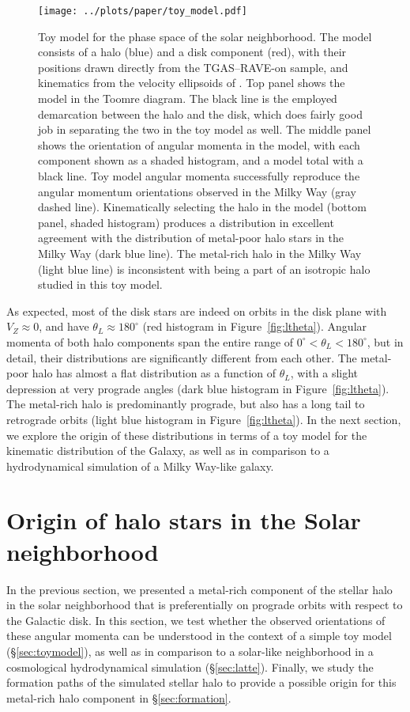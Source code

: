 \documentclass[apj, twocolappendix, numberedappendix, appendixfloats]{emulateapj}
\begin{document}
\begin{figure}
\begin{center}
\texttt{[image: ../plots/paper/toy\_model.pdf]}
\caption{Toy model for the phase space of the solar neighborhood.
The model consists of a halo (blue) and a disk component (red), with their positions drawn directly from the TGAS--RAVE-on sample, and kinematics from the velocity ellipsoids of \citet{bensby2003}.
Top panel shows the model in the Toomre diagram.
The black line is the employed demarcation between the halo and the disk, which does fairly good job in separating the two in the toy model as well.
The middle panel shows the orientation of angular momenta in the model, with each component shown as a shaded histogram, and a model total with a black line.
Toy model angular momenta successfully reproduce the angular momentum orientations observed in the Milky Way (gray dashed line).
Kinematically selecting the halo in the model (bottom panel, shaded histogram) produces a distribution in excellent agreement with the distribution of metal-poor halo stars in the Milky Way (dark blue line).
The metal-rich halo in the Milky Way (light blue line) is inconsistent with being a part of an isotropic halo studied in this toy model.}
\label{fig:toy}
\end{center}
\end{figure}

As expected, most of the disk stars are indeed on orbits in the disk plane with $V_Z\approx0$, and have $\theta_L\approx180^\circ$ (red histogram in Figure~\ref{fig:ltheta}).
Angular momenta of both halo components span the entire range of $0^\circ<\theta_L<180^\circ$, but in detail, their distributions are significantly different from each other.
The metal-poor halo has almost a flat distribution as a function of $\theta_L$, with a slight depression at very prograde angles (dark blue histogram in Figure~\ref{fig:ltheta}).
The metal-rich halo is predominantly prograde, but also has a long tail to retrograde orbits (light blue histogram in Figure~\ref{fig:ltheta}).
In the next section, we explore the origin of these distributions in terms of a toy model for the kinematic distribution of the Galaxy, as well as in comparison to a hydrodynamical simulation of a Milky Way-like galaxy.

\section{Origin of halo stars in the Solar neighborhood}
\label{sec:origin}
In the previous section, we presented a metal-rich component of the stellar halo in the solar neighborhood that is preferentially on prograde orbits with respect to the Galactic disk.
In this section, we test whether the observed orientations of these angular momenta can be understood in the context of a simple toy model (\S\ref{sec:toymodel}), as well as in comparison to a solar-like neighborhood in a cosmological hydrodynamical simulation (\S\ref{sec:latte}).
Finally, we study the formation paths of the simulated stellar halo to provide a possible origin for this metal-rich halo component in \S\ref{sec:formation}.
\end{document}
